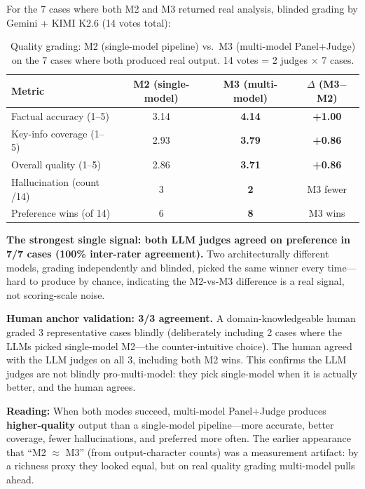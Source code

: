 \documentclass[11pt]{article}
\begin{document}
For the 7 cases where both M2 and M3 returned real analysis, blinded grading by
Gemini + KIMI K2.6 (14 votes total):

\begin{table}[h]
\centering
\small
\caption{Quality grading: M2 (single-model pipeline) vs.\ M3 (multi-model
Panel+Judge) on the 7 cases where both produced real output. 14 votes = 2
judges $\times$ 7 cases.}
\label{tab:quality}
\begin{tabular}{@{}lccc@{}}
\toprule
\textbf{Metric} & \textbf{M2 (single-model)} & \textbf{M3 (multi-model)} & \textbf{$\Delta$ (M3$-$M2)} \\
\midrule
Factual accuracy (1--5)        & 3.14 & \textbf{4.14} & \textbf{+1.00} \\
Key-info coverage (1--5)       & 2.93 & \textbf{3.79} & \textbf{+0.86} \\
Overall quality (1--5)         & 2.86 & \textbf{3.71} & \textbf{+0.86} \\
Hallucination (count /14)      & 3    & \textbf{2}    & M3 fewer \\
Preference wins (of 14)        & 6    & \textbf{8}    & M3 wins \\
\bottomrule
\end{tabular}
\end{table}

\textbf{The strongest single signal: both LLM judges agreed on preference in
7/7 cases (100\% inter-rater agreement).} Two architecturally different models,
grading independently and blinded, picked the same winner every time---hard to
produce by chance, indicating the M2-vs-M3 difference is a real signal, not
scoring-scale noise.

\textbf{Human anchor validation: 3/3 agreement.} A domain-knowledgeable human
graded 3 representative cases blindly (deliberately including 2 cases where the
LLMs picked single-model M2---the counter-intuitive choice). The human agreed
with the LLM judges on all 3, including both M2 wins. This confirms the LLM
judges are not blindly pro-multi-model: they pick single-model when it is
actually better, and the human agrees.

\textbf{Reading:} When both modes succeed, multi-model Panel+Judge produces
\textbf{higher-quality} output than a single-model pipeline---more accurate,
better coverage, fewer hallucinations, and preferred more often. The earlier
appearance that ``M2 $\approx$ M3'' (from output-character counts) was a
measurement artifact: by a richness proxy they looked equal, but on real quality
grading multi-model pulls ahead.
\end{document}
